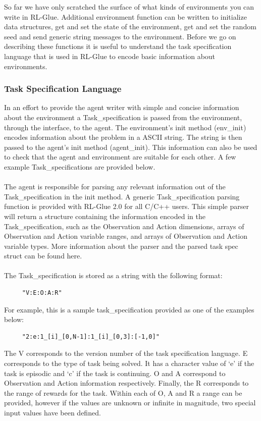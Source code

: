 \documentclass[11pt]{article}
\begin{document}
So far we have only scratched the surface of what kinds of environments you can write in RL-Glue. Additional environment function can be written to initialize data structures, get and set the state of the environment, get and set the random seed and send generic string messages to the environment. Before we go on describing these functions it is useful to understand the task specification language that is used in RL-Glue to encode basic information about environments. 

\subsubsection{Task Specification Language}
\label{task}
In an effort to provide the agent writer with simple and concise information about the environment a Task\_specification is passed from the environment, through the interface, to the agent. The environment's init method (env\_init) encodes information about the problem in a ASCII string. The string is then passed to the agent's init method (agent\_init).  This information can also be used to check that the agent and environment are suitable for each other. A few example Task\_specifications are provided below.
\\\\
The agent is responsible for parsing any relevant information out of the Task\_specification in the init method. A generic Task\_specification parsing function is provided with RL-Glue 2.0 for all C/C++ users. This simple parser will return a structure containing the information encoded in the Task\_specification, such as the Observation and Action dimensions, arrays of Observation and Action variable ranges, and arrays of Observation and Action variable types. More information about the parser and the parsed task spec struct can be found here.
\\\\
The Task\_specification is stored as a string with the following format:
\begin{verbatim}
     "V:E:O:A:R"
\end{verbatim}		
For example, this is a sample task\_specification provided as one of the examples below:
\begin{verbatim}
     "2:e:1_[i]_[0,N-1]:1_[i]_[0,3]:[-1,0]"
\end{verbatim}     
The V corresponds to the version number of the task specification language. E corresponds to the type of task being solved. It has a character value of `e' if the task is episodic and `c' if the task is continuing. O and A correspond to Observation and Action information respectively. Finally, the R corresponds to the range of rewards for the task. Within each of O, A and R a range can be provided, however if the values are unknown or infinite in magnitude, two special input values have been defined.
\end{document}
